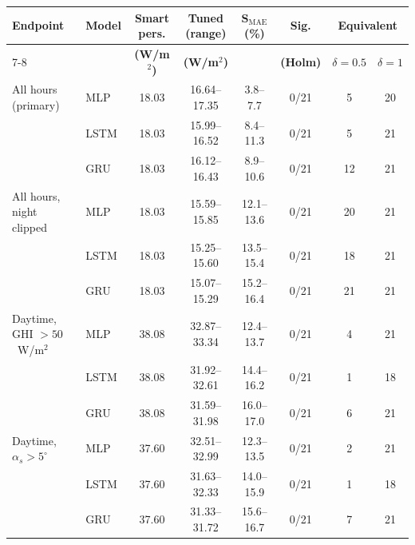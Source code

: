 \begin{tabular}{llcccccc}
\toprule
\textbf{Endpoint} & \textbf{Model} & \textbf{Smart pers.} & \textbf{Tuned (range)} & $\boldsymbol{S_{\mathrm{MAE}}}$ \textbf{(\%)} & \textbf{Sig.} & \multicolumn{2}{c}{\textbf{Equivalent}} \\
\cmidrule(lr){7-8}
 & & \textbf{(W/m$^2$)} & \textbf{(W/m$^2$)} & & \textbf{(Holm)} & $\delta=0.5$ & $\delta=1$ \\
\midrule
All hours (primary) & MLP & 18.03 & 16.64--17.35 & 3.8--7.7 & 0/21 & 5 & 20 \\
 & LSTM & 18.03 & 15.99--16.52 & 8.4--11.3 & 0/21 & 5 & 21 \\
 & GRU & 18.03 & 16.12--16.43 & 8.9--10.6 & 0/21 & 12 & 21 \\
\midrule
All hours, night clipped & MLP & 18.03 & 15.59--15.85 & 12.1--13.6 & 0/21 & 20 & 21 \\
 & LSTM & 18.03 & 15.25--15.60 & 13.5--15.4 & 0/21 & 18 & 21 \\
 & GRU & 18.03 & 15.07--15.29 & 15.2--16.4 & 0/21 & 21 & 21 \\
\midrule
Daytime, GHI $>50$~W/m$^2$ & MLP & 38.08 & 32.87--33.34 & 12.4--13.7 & 0/21 & 4 & 21 \\
 & LSTM & 38.08 & 31.92--32.61 & 14.4--16.2 & 0/21 & 1 & 18 \\
 & GRU & 38.08 & 31.59--31.98 & 16.0--17.0 & 0/21 & 6 & 21 \\
\midrule
Daytime, $\alpha_s>5^{\circ}$ & MLP & 37.60 & 32.51--32.99 & 12.3--13.5 & 0/21 & 2 & 21 \\
 & LSTM & 37.60 & 31.63--32.33 & 14.0--15.9 & 0/21 & 1 & 18 \\
 & GRU & 37.60 & 31.33--31.72 & 15.6--16.7 & 0/21 & 7 & 21 \\
\bottomrule
\end{tabular}

